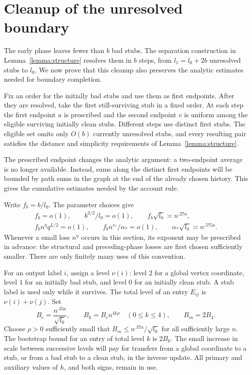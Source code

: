 \section{Cleanup of the unresolved boundary}
\label{sec:cleanup}

The early phase leaves fewer than $b$ bad stubs.  The separation
construction in Lemma~\ref{lemma:structure} resolves them in $b$ steps,
from $l_1=l_0+2b$ unresolved stubs to $l_0$.  We now prove that this
cleanup also preserves the analytic estimates needed for boundary
completion.

Fix an order for the initially bad stubs and use them as first endpoints.
After they are resolved, take the first still-surviving stub in a fixed
order.  At each step the first endpoint $u$ is prescribed and the second
endpoint $v$ is uniform among
the eligible surviving initially clean stubs.  Different steps use
distinct first stubs.  The eligible set omits only $O(b)$ currently
unresolved stubs, and every resulting pair satisfies the distance and
simplicity requirements of Lemma~\ref{lemma:structure}.

The prescribed endpoint changes the analytic argument: a two-endpoint
average is no longer available.  Instead, sums along the distinct first
endpoints will be bounded by path sums in the graph at the end of the
already chosen history.  This gives the cumulative estimates needed by
the account rule.

Write $f_b=b/l_0$.  The parameter choices give
\begin{equation}
\begin{gathered}
 f_b=o(1),\qquad b^{3/2}/l_0=o(1),\qquad
 f_b\sqrt{l_0}\asymp n^{.27a},\\
 f_b n^\eta q^{L/2}=o(1),\qquad
 f_b n^{v_*}/\alpha_*=o(1),\qquad
 \alpha_*\sqrt{l_0}\asymp n^{.575a}.
\end{gathered}
\label{eq:original-35}
\end{equation}
Whenever a small loss $n^\eta$ occurs in this section, its exponent may
be prescribed in advance: the structural and preceding-phase losses
are first chosen sufficiently smaller.  There are only finitely many
uses of this convention.

For an output label $i$, assign a level $\nu(i)$: level $2$ for a global
vertex coordinate, level $1$ for an initially bad stub, and level $0$ for
an initially clean stub.  A stub label is used only while it survives.
The total level of an entry $E_{ij}$ is $\nu(i)+\nu(j)$.  Set
\[
 B_c=\frac{n^{.35a}}{\sqrt{l_0}},\qquad
 B_k=B_c n^{4k\rho}\quad(0\leq k\leq4),\qquad B_m=2B_4.
\]
Choose $\rho>0$ sufficiently small that
$B_m\leq n^{.37a}/\sqrt{l_0}$ for all sufficiently large $n$.
The bootstrap bound for an entry of total level $k$ is $2B_k$.
The small increase in scale between successive levels will pay for
transfers from a global coordinate to a stub, or from a bad stub to a
clean stub, in the inverse update.
All primary and auxiliary values of $h$, and both signs, remain in use.

